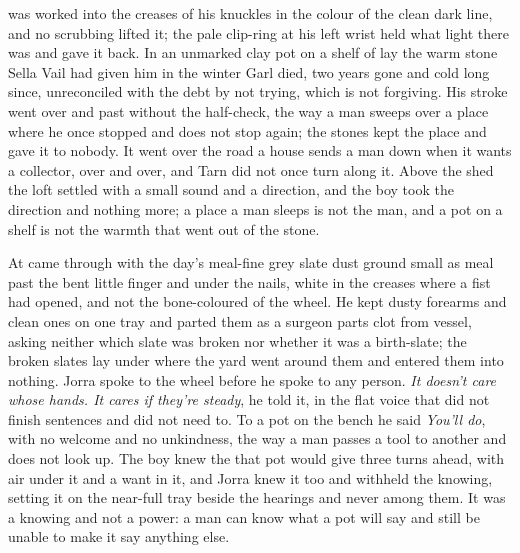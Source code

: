  was worked into the creases of his knuckles in the colour of the clean dark line, and no scrubbing lifted it; the pale clip-ring at his left wrist held what light there was and gave it back. In an unmarked clay pot on a shelf of  lay the warm stone Sella Vail had given him in the winter Garl died, two years gone and cold long since, unreconciled with the debt by not trying, which is not forgiving. His stroke went over  and past  without the half-check, the way a man sweeps over a place where he once stopped and does not stop again; the stones kept the place and gave it to nobody. It went over the road a house sends a man down when it wants a collector, over and over, and Tarn did not once turn along it. Above the shed the loft settled with a small sound and a direction, and the boy took the direction and nothing more; a place a man sleeps is not the man, and a pot on a shelf is not the warmth that went out of the stone.

\scenebreak

At   came through with the day's meal-fine grey slate dust ground small as meal past the bent little finger and under the nails, white in the creases where a fist had opened, and not the bone-coloured  of the wheel. He kept dusty forearms and clean ones on one tray and parted them as a surgeon parts clot from vessel, asking neither which slate was broken nor whether it was a birth-slate; the broken slates lay under  where the yard went around them and entered them into nothing. Jorra spoke to the wheel before he spoke to any person. \emph{It doesn't care whose hands. It cares if they're steady}, he told it, in the flat voice that did not finish sentences and did not need to. To a pot on the bench he said \emph{You'll do}, with no welcome and no unkindness, the way a man passes a tool to another and does not look up. The boy knew the  that pot would give three turns ahead, with air under it and a want in it, and Jorra knew it too and withheld the knowing, setting it on the near-full tray beside the hearings and never among them. It was a knowing and not a power: a man can know what a pot will say and still be unable to make it say anything else.

